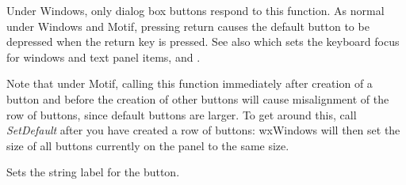 Under Windows, only dialog box buttons respond to this function.  As
normal under Windows and Motif, pressing return causes the default button to
be depressed when the return key is pressed. See also \rtfsp
which sets the keyboard focus for windows and text panel items,\rtfsp
and .

Note that under Motif, calling this function immediately after
creation of a button and before the creation of other buttons
will cause misalignment of the row of buttons, since default
buttons are larger. To get around this, call {\it SetDefault}\rtfsp
after you have created a row of buttons: wxWindows will
then set the size of all buttons currently on the panel to
the same size.

\label{wxbuttonsetlabel}


Sets the string label for the button.





